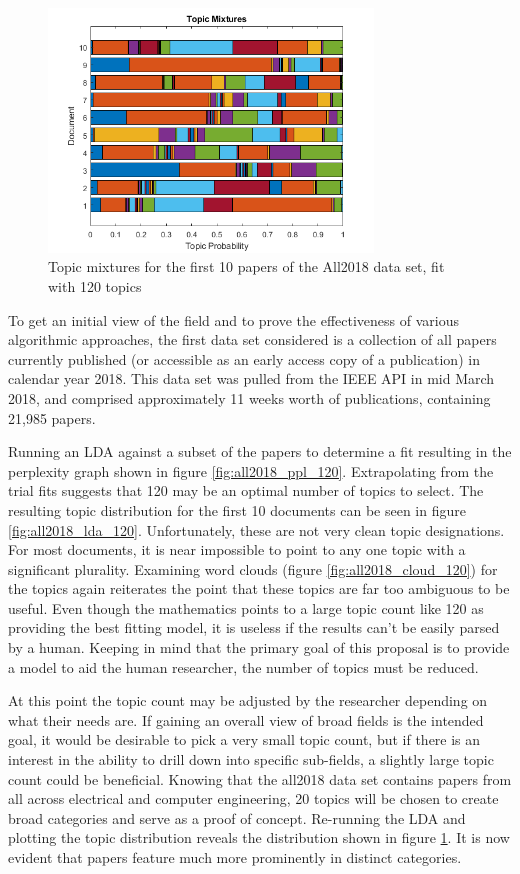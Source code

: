 \documentclass[conference]{IEEEtran}
\begin{document}
\begin{figure}
	\centering
	\includegraphics[width=3.4in]{all2018_lda_20.png}
	\caption{Topic mixtures for the first 10 papers of the All2018 data set, fit with 120 topics}
	\label{fig:all2018_lda_20}
\end{figure}

To get an initial view of the field and to prove the effectiveness of various algorithmic approaches, the first data set considered is a collection of all papers currently published (or accessible as an early access copy of a publication) in calendar year 2018. This data set was pulled from the IEEE API in mid March 2018, and comprised approximately 11 weeks worth of publications, containing 21,985 papers.

Running an LDA against a subset of the papers to determine a fit resulting in the perplexity graph shown in figure \ref{fig:all2018_ppl_120}. Extrapolating from the trial fits suggests that 120 may be an optimal number of topics to select. The resulting topic distribution for the first 10 documents can be seen in figure \ref{fig:all2018_lda_120}. Unfortunately, these are not very clean topic designations. For most documents, it is near impossible to point to any one topic with a significant plurality. Examining word clouds (figure \ref{fig:all2018_cloud_120}) for the topics again reiterates the point that these topics are far too ambiguous to be useful. Even though the mathematics points to a large topic count like 120 as providing the best fitting model, it is useless if the results can't be easily parsed by a human. Keeping in mind that the primary goal of this proposal is to provide a model to aid the human researcher, the number of topics must be reduced.

At this point the topic count may be adjusted by the researcher depending on what their needs are. If gaining an overall view of broad fields is the intended goal, it would be desirable to pick a very small topic count, but if there is an interest in the ability to drill down into specific sub-fields, a slightly large topic count could be beneficial. Knowing that the all2018 data set contains papers from all across electrical and computer engineering, 20 topics will be chosen to create broad categories and serve as a proof of concept. Re-running the LDA and plotting the topic distribution reveals the distribution shown in figure \ref{fig:all2018_lda_20}. It is now evident that papers feature much more prominently in distinct categories.
\end{document}
